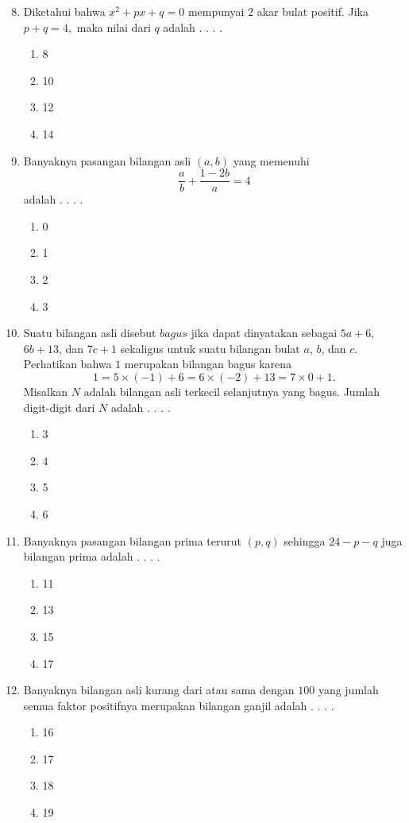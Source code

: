 \documentclass[12pt]{scrartcl}
\begin{document}
\begin{enumerate}[label={Soal \arabic*}]
    \setcounter{enumi}{7}
    \item Diketahui bahwa $x^2+px+q=0$ mempunyai $2$ akar bulat positif. Jika $p+q=4,$ maka nilai dari $q$ adalah . . . .
    \begin{enumerate}[label={(\Alph*)}]
        \item 8 \item 10 \item 12 \item 14
    \end{enumerate}

    \item Banyaknya pasangan bilangan asli $(a,b)$ yang memenuhi
    $$\frac{a}{b} + \frac{1-2b}{a} =4$$
    adalah . . . .
    \begin{enumerate}[label={(\Alph*)}]
        \item 0 \item 1 \item 2 \item 3
    \end{enumerate}
    
    \item Suatu bilangan asli disebut $bagus$ jika dapat dinyatakan sebagai $5a+6$, $6b+13$, dan $7c+1$ sekaligus untuk suatu bilangan bulat $a$, $b$, dan $c$. Perhatikan bahwa $1$ merupakan bilangan bagus karena
    $$1 = 5\times (-1)+6 = 6\times (-2) +13 = 7\times 0+1.$$
    Misalkan $N$ adalah bilangan asli terkecil selanjutnya yang bagus. Jumlah digit-digit dari $N$ adalah . . . .
    \begin{enumerate}[label={(\Alph*)}]
        \item 3 \item 4 \item 5 \item 6
    \end{enumerate}

    \item Banyaknya pasangan bilangan prima terurut $(p,q)$ sehingga $24-p-q$ juga bilangan prima adalah . . . .
    \begin{enumerate}[label={(\Alph*)}]
        \item 11 \item 13 \item 15 \item 17
    \end{enumerate}

    \item Banyaknya bilangan asli kurang dari atau sama dengan $100$ yang jumlah semua faktor positifnya merupakan bilangan ganjil adalah . . . .
    \begin{enumerate}[label={(\Alph*)}]
        \item 16 \item 17 \item 18 \item 19
    \end{enumerate}
\end{enumerate}
\end{document}
